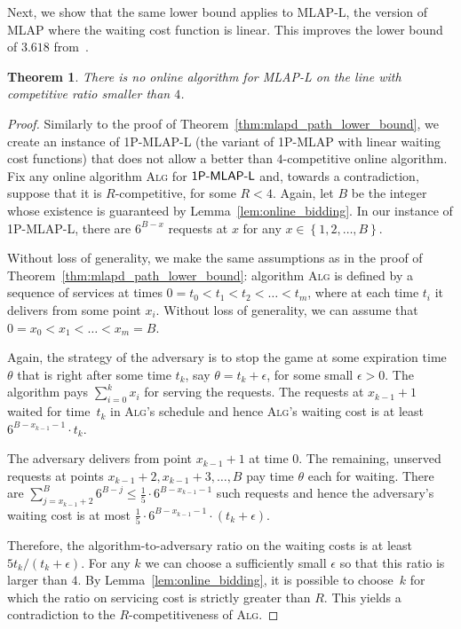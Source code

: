 \documentclass[a4paper]{article}
\newtheorem{theorem}{Theorem}[section]
\newcommand{\braced}[1]{{ \left\{ #1 \right\} }}
\newcommand{\MLAP}{\mbox{\rm\textsf{MLAP}}}
\newcommand{\MLAPL}{\mbox\rm{\textsf{MLAP-L}}}
\newcommand{\SPMLAP}{\mbox{\rm\textsf{1P-MLAP}}}
\newcommand{\SPMLAPL}{\mbox{\rm\textsf{1P-MLAP-L}}}
\newcommand{\expiration}{\theta}
\newcommand{\ALG}{\textsc{Alg}}
\newcommand{\onefifth}{{\textstyle\frac{1}{5}}}
\begin{document}
Next, we show that the same lower bound applies to {\MLAPL}, the version of
{\MLAP} where the waiting cost function is linear. This improves the lower
bound of $3.618$ from~\cite{aggregation_wads_2013}.


\begin{theorem}
\label{thm:mlapl_path_lower_bound}
There is no online algorithm for {\MLAPL} on the line with competitive ratio smaller than $4$.
\end{theorem}

\begin{proof}
Similarly to the proof of Theorem~\ref{thm:mlapd_path_lower_bound}, we create an instance of 
{\SPMLAPL} (the variant of {\SPMLAP} with linear waiting cost functions)
that does not allow a better than $4$-competitive online algorithm.
Fix any online algorithm {\ALG} for $\SPMLAPL$
and, towards a contradiction, suppose that it is $R$-competitive, for some $R < 4$.
Again, let $B$ be the integer whose existence is guaranteed by Lemma~\ref{lem:online_bidding}.
In our instance of {\SPMLAPL}, there are $6^{B-x}$ requests at $x$ for any 
$x \in \braced{1, 2,\ldots, B}$. 

Without loss of generality, we make the same assumptions as in the proof of
Theorem~\ref{thm:mlapd_path_lower_bound}: algorithm {\ALG} is defined by
a sequence of services at times $0 = t_0 < t_1 < t_2 < \ldots < t_m$,
where at each time $t_i$ it delivers from some point $x_i$. Without loss of generality,
we can assume that $0 = x_0 < x_1 < \ldots < x_m = B$. 

Again, the strategy of the adversary is to stop the game at some expiration time $\expiration$
that is right after some time $t_k$, say $\expiration = t_k + \epsilon$, for some small $\epsilon > 0$.
The algorithm pays $\sum_{i=0}^k x_i$ for serving the requests. The  
requests at $x_{k-1} + 1$ waited for time~$t_k$ in {\ALG}'s schedule 
and hence {\ALG}'s waiting cost is at least $6^{B-x_{k-1}-1} \cdot t_k$. 

The adversary delivers from point $x_{k-1} + 1$ at time $0$.
The remaining, unserved requests at points $x_{k-1} + 2, x_{k-1} + 3, \ldots, B$
pay time $\expiration$ each for waiting. 
There are $\sum_{j=x_{k-1}+2}^B 6^{B-j} 
			\leq  \onefifth\cdot 6^{B-x_{k-1}-1}$ 
such requests and hence the adversary's waiting cost is at most 
$\onefifth\cdot 6^{B-x_{k-1}-1} \cdot (t_k+\epsilon)$.

Therefore, the algorithm-to-adversary ratio on the waiting costs is 
at least $5t_k/(t_k+\epsilon)$. For any $k$ we can choose a sufficiently small $\epsilon$
so that this ratio is larger than $4$.
By Lemma~\ref{lem:online_bidding}, it is possible to choose~$k$ for which
the ratio on servicing cost is strictly greater than $R$. 
This yields a contradiction to the $R$-competitiveness of {\ALG}.
\end{proof}
\end{document}
